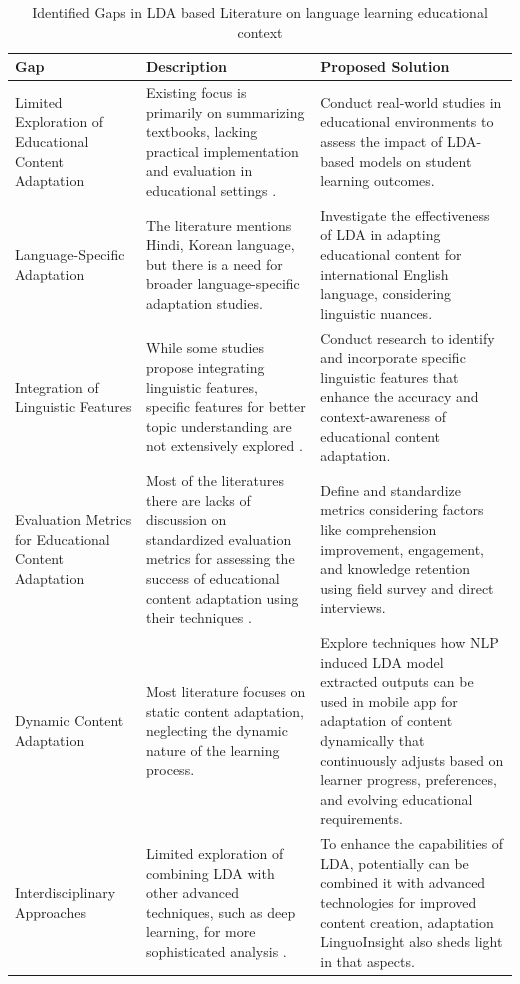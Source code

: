 \documentclass[sn-mathphys,Numbered]{sn-jnl}%
\theoremstyle{thmstyleone}%
\theoremstyle{thmstyletwo}%
\theoremstyle{thmstylethree}%
\begin{document}
\begin{table}[h]
  \centering
  \caption{Identified Gaps in LDA based Literature on language learning educational context}
  \begin{tabular}{@{}p{2cm}p{3.5cm}p{5cm}@{}}
    \toprule
    \textbf{Gap} & \textbf{Description} & \textbf{Proposed Solution} \\
    \midrule
    Limited Exploration of Educational Content Adaptation & Existing focus is primarily on summarizing textbooks, lacking practical implementation and evaluation in educational settings \cite{chen2020detecting}. & Conduct real-world studies in educational environments to assess the impact of LDA-based models on student learning outcomes. \\
    \hline
    Language-Specific Adaptation & The literature mentions Hindi, Korean \cite{korean2021research} language, but there is a need for broader language-specific adaptation studies. & Investigate the effectiveness of LDA in adapting educational content for international English language, considering linguistic nuances. \\
    \hline
    Integration of Linguistic Features & While some studies propose integrating linguistic features, specific features for better topic understanding are not extensively explored \cite{molavi2020extracting}. & Conduct research to identify and incorporate specific linguistic features that enhance the accuracy and context-awareness of educational content adaptation. \\
    \hline
    Evaluation Metrics for Educational Content Adaptation &  Most of the literatures there are lacks of discussion on standardized evaluation metrics for assessing the success of educational content adaptation using their techniques \cite{hamzah2020discovering}. & Define and standardize metrics considering factors like comprehension improvement, engagement, and knowledge retention using field survey and direct interviews. \\
    \hline
    Dynamic Content Adaptation & Most literature focuses on static content adaptation, neglecting the dynamic nature of the learning process. & Explore techniques how NLP induced LDA model extracted outputs can be used in mobile app for adaptation of content dynamically that continuously adjusts based on learner progress, preferences, and evolving educational requirements. \\
    \hline
    Interdisciplinary Approaches & Limited exploration of combining LDA with other advanced techniques, such as deep learning, for more sophisticated analysis \cite{hamzah2020discovering}. & To enhance the capabilities of LDA, potentially can be combined it with advanced technologies for improved content creation, adaptation LinguoInsight also sheds light in that aspects.\\
    \bottomrule
  \end{tabular}
  \label{gap_finder_table}
\end{table}
\end{document}
